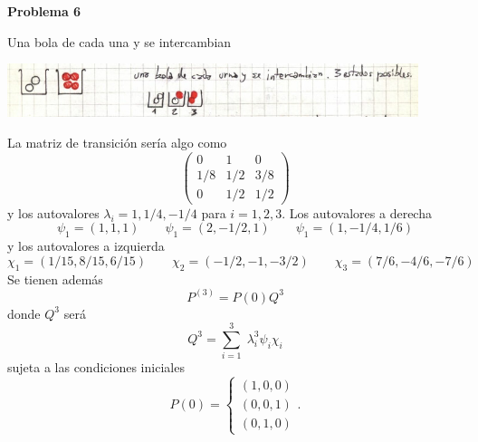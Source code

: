 \documentclass[10pt,oneside]{CBFT_book}
\begin{document}
\begin{ejemplo}{\bf Problema 6}

Una bola de cada una y se intercambian

\includegraphics[width=0.90\textwidth]{images/1606329219.jpg}

La matriz de transición sería algo como
\[
	\begin{pmatrix}
	 0 	&	1	&	0	\\
	 1/8 	&	1/2	&	3/8	\\
	 0 	&	1/2	&	1/2	
	\end{pmatrix}
\]
y los autovalores $\lambda_i = 1, 1/4, -1/4$ para $i=1,2,3$.
Los autovalores a derecha
\[
	\psi_1 = (1,1,1) \qquad 
	\psi_1 = (2,-1/2,1) \qquad 
	\psi_1 = (1,-1/4,1/6) 
\]
y los autovalores a izquierda
\[
	\chi_1 = ( 1/15, 8/15, 6/15 ) \qquad
	\chi_2 = ( -1/2, -1, -3/2 ) \qquad 
	\chi_3 = ( 7/6, -4/6, -7/6 ) 
\]
Se tienen además
\[
	P^{(3)} = P(0) Q^3
\]
donde $Q^3$ será
\[
	Q^3 = \sum_{i=1}^3 \; \lambda_i^3  \psi_i \chi_i
\]
sujeta a las condiciones iniciales
\[
	P(0) = \begin{cases}
	 (1,0,0) \\
	 (0,0,1) \\
	 (0,1,0)
	\end{cases}.
\]


\end{ejemplo}

\end{document}
